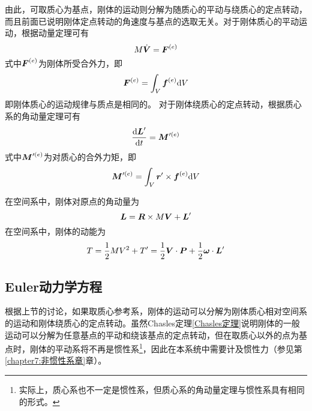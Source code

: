由此，可取质心为基点，刚体的运动则分解为随质心的平动与绕质心的定点转动，而且前面已说明刚体定点转动的角速度与基点的选取无关。对于刚体质心的平动运动，根据动量定理可有
\begin{equation}
	M \dot{\boldsymbol{V}} = \boldsymbol{F}^{(e)}
\end{equation}
式中$\boldsymbol{F}^{(e)}$为刚体所受合外力，即
\begin{equation*}
	\boldsymbol{F}^{(e)} = \int_V \boldsymbol{f}^{(e)} \mathrm{d} V
\end{equation*}
即刚体质心的运动规律与质点是相同的。
对于刚体绕质心的定点转动，根据质心系的角动量定理可有
\begin{equation}
	\frac{\mathrm{d} \boldsymbol{L}'}{\mathrm{d} t} = \boldsymbol{M}'^{(e)}
\end{equation}
式中$\boldsymbol{M}'^{(e)}$为对质心的合外力矩，即
\begin{equation*}
	\boldsymbol{M}'^{(e)} = \int_V \boldsymbol{r}' \times \boldsymbol{f}^{(e)} \mathrm{d} V
\end{equation*}

在空间系中，刚体对原点的角动量为
\begin{equation}
	\boldsymbol{L} = \boldsymbol{R} \times M \boldsymbol{V} + \boldsymbol{L}'
\end{equation}
在空间系中，刚体的动能为
\begin{equation}
	T = \frac12 MV^2 + T' = \frac12 \boldsymbol{V} \cdot \boldsymbol{P} + \frac12 \boldsymbol{\omega} \cdot \boldsymbol{L}'
\end{equation}

\subsection{Euler动力学方程}

根据上节的讨论，如果取质心参考系，刚体的运动可以分解为刚体质心相对空间系的运动和刚体绕质心的定点转动。虽然Chasles定理\ref{Chasles定理}说明刚体的一般运动可以分解为任意基点的平动和绕该基点的定点转动，但在取质心以外的点为基点时，刚体的平动系将不再是惯性系\footnote{实际上，质心系也不一定是惯性系，但质心系的角动量定理与惯性系具有相同的形式。}，因此在本系统中需要计及惯性力（参见第\ref{chapter7:非惯性系章}章）。

